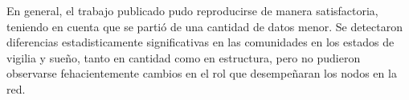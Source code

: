 \documentclass[a4paper,10pt,twocolumn,spanish]{article}
\begin{document}
En general, el trabajo publicado pudo reproducirse de manera satisfactoria, teniendo en cuenta que se partió de una cantidad de datos menor. Se detectaron diferencias estadisticamente significativas en las comunidades en los estados de vigilia  y sueño, tanto en cantidad como en estructura, pero no pudieron observarse fehacientemente cambios en el rol que desempeñaran los nodos en la red.


\end{document}
